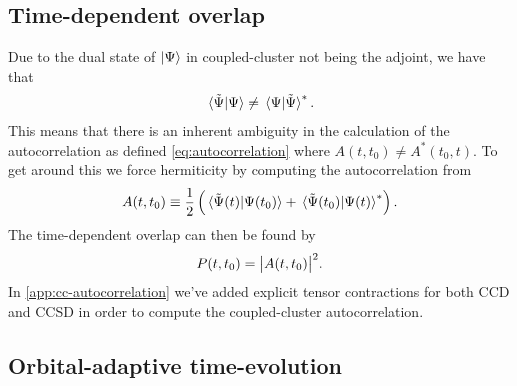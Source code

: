         \subsection{Time-dependent overlap}
            Due to the dual state of $\ket{\Psi}$ in coupled-cluster not being
            the adjoint, we have that
            \begin{align}
                \braket*{\tilde{\Psi}}{\Psi}
                \neq \braket*{\Psi}{\tilde{\Psi}}^{*}.
            \end{align}
            This means that there is an inherent ambiguity in the calculation of
            the autocorrelation as defined \autoref{eq:autocorrelation} where
            $A(t, t_0) \neq A^{*}(t_0, t)$.
            To get around this we force hermiticity by computing the
            autocorrelation from \cite{pedersen2018symplectic}
            \begin{align}
                A(t, t_0)
                \equiv \frac{1}{2}\left( 
                    \braket*{\tilde{\Psi}(t)}{\Psi(t_0)}
                    + \braket*{\tilde{\Psi}(t_0)}{\Psi(t)}^{*}
                 \right).
            \end{align}
            The time-dependent overlap can then be found by
            \begin{align}
                P(t, t_0)
                = \abs{A(t, t_0)}^2.
            \end{align}
            In \autoref{app:cc-autocorrelation} we've added explicit tensor
            contractions for both CCD and CCSD in order to compute the
            coupled-cluster autocorrelation.

        \subsection{Orbital-adaptive time-evolution}
            \label{subsec:oatdcc-implementation}

